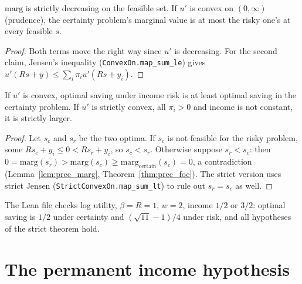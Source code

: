 \begin{lemma}
\label{lem:prec_marg}
\leanok
{}
$\mathrm{marg}$ is strictly decreasing on the feasible set. If $u'$ is convex on $(0,\infty)$ (prudence), the
certainty problem's marginal value is at most the risky one's at every feasible $s$.
\end{lemma}
\begin{proof}
\leanok
Both terms move the right way since $u'$ is decreasing. For the second claim, Jensen's inequality
(\texttt{ConvexOn.map\_sum\_le}) gives $u'(Rs + \bar y) \le \sum_i\pi_iu'(Rs + y_i)$.
\end{proof}

\begin{theorem}
\label{thm:precautionary}
\leanok
{}
If $u'$ is convex, optimal saving under income risk is at least optimal saving in the certainty problem. If $u'$ is
strictly convex, all $\pi_i > 0$ and income is not constant, it is strictly larger.
\end{theorem}
\begin{proof}
\leanok
Let $s_c$ and $s_r$ be the two optima. If $s_c$ is not feasible for the risky problem, some $Rs_c + y_i \le 0 < Rs_r + y_i$,
so $s_c < s_r$. Otherwise suppose $s_r < s_c$: then $0 = \mathrm{marg}(s_r) > \mathrm{marg}(s_c) \ge
\mathrm{marg}_{\mathrm{certain}}(s_c) = 0$, a contradiction (Lemma~\ref{lem:prec_marg}, Theorem~\ref{thm:prec_foc}).
The strict version uses strict Jensen (\texttt{StrictConvexOn.map\_sum\_lt}) to rule out $s_r = s_c$ as well.
\end{proof}

\begin{definition}[Example]
\label{def:prec_example}
\leanok
{}
The Lean file checks log utility, $\beta = R = 1$, $w = 2$, income $1/2$ or $3/2$: optimal saving is $1/2$ under
certainty and $(\sqrt{11} - 1)/4$ under risk, and all hypotheses of the strict theorem hold.
\end{definition}

\section{The permanent income hypothesis}
\label{sec:pih}

